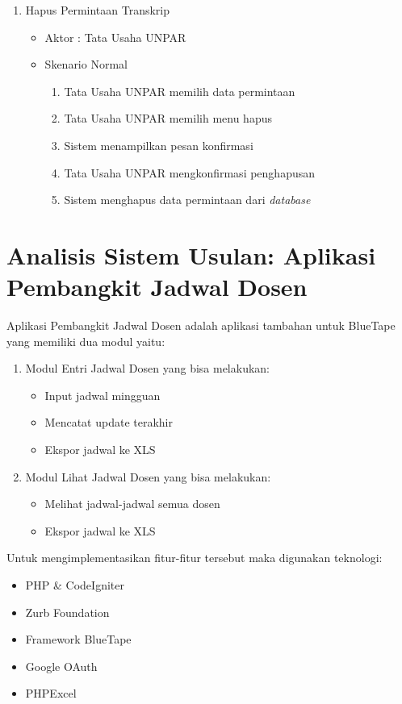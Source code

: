\begin{enumerate}
	\item Hapus Permintaan Transkrip
	\begin{itemize}
		\item Aktor : Tata Usaha UNPAR
		\item Skenario Normal
			\begin{enumerate}[1.]
				\item Tata Usaha UNPAR memilih data permintaan
				\item Tata Usaha UNPAR memilih menu hapus
				\item Sistem menampilkan pesan konfirmasi
				\item Tata Usaha UNPAR mengkonfirmasi penghapusan
				\item Sistem menghapus data permintaan dari \textit{database}
			\end{enumerate}
	\end{itemize}

	
\end{enumerate}

\section{Analisis Sistem Usulan: Aplikasi Pembangkit Jadwal Dosen}
Aplikasi Pembangkit Jadwal Dosen adalah aplikasi tambahan untuk BlueTape yang memiliki dua modul yaitu:
\begin{enumerate}
	\item Modul Entri Jadwal Dosen yang bisa melakukan:
		\begin{itemize}
			\item Input jadwal mingguan
			\item Mencatat update terakhir
			\item Ekspor jadwal ke XLS
		\end{itemize}
	\item Modul Lihat Jadwal Dosen yang bisa melakukan:
		\begin{itemize}
			\item Melihat jadwal-jadwal semua dosen
			\item Ekspor jadwal ke XLS
		\end{itemize}
\end{enumerate}
Untuk mengimplementasikan fitur-fitur tersebut maka digunakan teknologi:
\begin{itemize}
	\item PHP \& CodeIgniter
	\item Zurb Foundation
	\item Framework BlueTape
	\item Google OAuth
	\item PHPExcel
\end{itemize}

